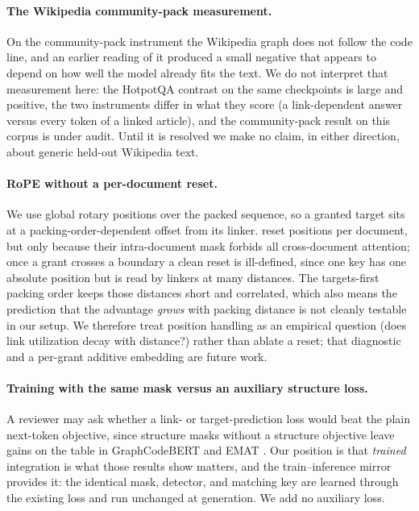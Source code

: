 \paragraph{The Wikipedia community-pack measurement.}
On the community-pack instrument the Wikipedia graph does not follow the code line,
and an earlier reading of it produced a small negative that appears to depend on how
well the model already fits the text. We do not interpret that measurement here: the
HotpotQA contrast on the same checkpoints is large and positive, the two instruments
differ in what they score (a link-dependent answer versus every token of a linked
article), and the community-pack result on this corpus is under audit. Until it is
resolved we make no claim, in either direction, about generic held-out Wikipedia text.

\paragraph{RoPE without a per-document reset.}
We use global rotary positions over the packed sequence, so a granted target sits at a
packing-order-dependent offset from its linker. \citet{zhao2024analysing} reset
positions per document, but only because their intra-document mask forbids all
cross-document attention; once a grant crosses a boundary a clean reset is ill-defined,
since one key has one absolute position but is read by linkers at many distances. The
targets-first packing order keeps those distances short and correlated, which also
means the prediction that the advantage \emph{grows} with packing distance is not
cleanly testable in our setup. We therefore treat position handling as an empirical
question (does link utilization decay with distance?) rather than ablate a reset; that
diagnostic and a per-grant additive embedding are future work.

\paragraph{Training with the same mask versus an auxiliary structure loss.}
A reviewer may ask whether a link- or target-prediction loss would beat the plain
next-token objective, since structure masks without a structure objective leave gains
on the table in GraphCodeBERT \citep{guo2021graphcodebert} and EMAT
\citep{wu2022emat}. Our position is that \emph{trained} integration is what those
results show matters, and the train--inference mirror provides it: the identical mask,
detector, and matching key are learned through the existing loss and run unchanged at
generation. We add no auxiliary loss.

